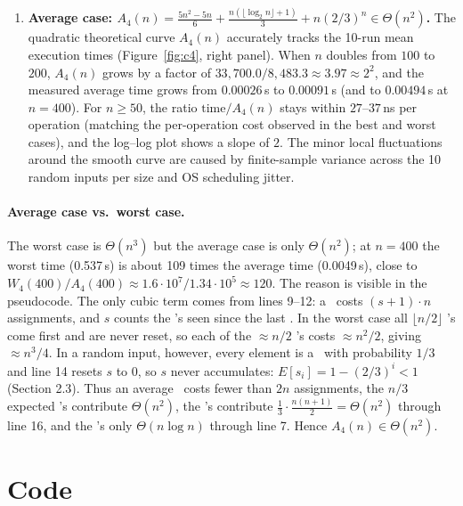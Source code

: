 \documentclass[11pt]{article}
\newcommand{\lgn}{\lfloor \log_2 n \rfloor}
\newcommand{\cha}{\text{`a'}}
\newcommand{\chb}{\text{`b'}}
\newcommand{\chc}{\text{`c'}}
\theoremstyle{remark}
\begin{document}
\begin{enumerate}[label=\textbf{(\arabic*)},nosep]
\item \textbf{Average case: $A_4(n)=\frac{5n^2-5n}{6}+\frac{n(\lgn+1)}3+n(2/3)^n\in\Theta(n^2)$.}
  The quadratic theoretical curve $A_4(n)$ accurately tracks the 10-run mean execution times (Figure~\ref{fig:c4}, right panel). When $n$ doubles from $100$ to $200$, $A_4(n)$ grows by a factor of $33{,}700.0 / 8{,}483.3 \approx 3.97 \approx 2^2$, and the measured average time grows from $0.00026$\,s to $0.00091$\,s (and to $0.00494$\,s at $n=400$). For $n\ge50$, the ratio $\text{time}/A_4(n)$ stays within $27$--$37$\,ns per operation (matching the per-operation cost observed in the best and worst cases), and the log--log plot shows a slope of $2$. The minor local fluctuations around the smooth curve are caused by finite-sample variance across the 10 random inputs per size and OS scheduling jitter.
\end{enumerate}

\vspace{-0.6em}
\paragraph{Average case vs.\ worst case.} The worst case is $\Theta(n^3)$ but the average case is
only $\Theta(n^2)$; at $n=400$ the worst time (0.537\,s) is about 109 times the average time
(0.0049\,s), close to $W_4(400)/A_4(400)\approx 1.6\cdot10^7/1.34\cdot10^5\approx120$.
The reason is visible in the pseudocode. The only cubic term comes from lines 9--12: a \chb\
costs $(s+1)\cdot n$ assignments, and $s$ counts the \cha's seen since the last \chc. In the
worst case all $\lfloor n/2\rfloor$ \cha's come first and are never reset, so each of the
$\approx n/2$ \chb's costs $\approx n^2/2$, giving $\approx n^3/4$. In a random input, however,
every element is a \chc\ with probability $1/3$ and line 14 resets $s$ to 0, so $s$ never
accumulates: $E[s_i]=1-(2/3)^i<1$ (Section 2.3). Thus an average \chb\ costs fewer than $2n$
assignments, the $n/3$ expected \chb's contribute $\Theta(n^2)$, the \chc's contribute
$\frac13\cdot\frac{n(n+1)}2=\Theta(n^2)$ through line 16, and the \cha's only
$\Theta(n\log n)$ through line 7. Hence $A_4(n)\in\Theta(n^2)$.

\vspace{-0.6em}
\section{Code}
\end{document}
